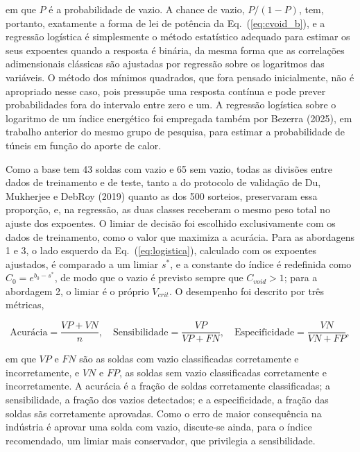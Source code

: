 \documentclass[12pt,openany]{report}
\begin{document}
\noindent em que $P$ é a probabilidade de vazio. A chance de vazio, $P/(1-P)$, tem, portanto, exatamente a forma de lei de potência da Eq.~(\ref{eq:cvoid_b}), e a regressão logística é simplesmente o método estatístico adequado para estimar os seus expoentes quando a resposta é binária, da mesma forma que as correlações adimensionais clássicas são ajustadas por regressão sobre os logaritmos das variáveis. O método dos mínimos quadrados, que fora pensado inicialmente, não é apropriado nesse caso, pois pressupõe uma resposta contínua e pode prever probabilidades fora do intervalo entre zero e um. A regressão logística sobre o logaritmo de um índice energético foi empregada também por Bezerra (2025), em trabalho anterior do mesmo grupo de pesquisa, para estimar a probabilidade de túneis em função do aporte de calor.

Como a base tem 43 soldas com vazio e 65 sem vazio, todas as divisões entre dados de treinamento e de teste, tanto a do protocolo de validação de Du, Mukherjee e DebRoy (2019) quanto as dos 500 sorteios, preservaram essa proporção, e, na regressão, as duas classes receberam o mesmo peso total no ajuste dos expoentes. O limiar de decisão foi escolhido exclusivamente com os dados de treinamento, como o valor que maximiza a acurácia. Para as abordagens 1 e 3, o lado esquerdo da Eq.~(\ref{eq:logistica}), calculado com os expoentes ajustados, é comparado a um limiar $s^{*}$, e a constante do índice é redefinida como $C_0 = e^{b_0 - s^{*}}$, de modo que o vazio é previsto sempre que $C_{void} > 1$; para a abordagem 2, o limiar é o próprio $V_{crit}$. O desempenho foi descrito por três métricas,

\begin{equation}
\text{Acurácia} = \frac{VP + VN}{n}, \quad \text{Sensibilidade} = \frac{VP}{VP + FN}, \quad \text{Especificidade} = \frac{VN}{VN + FP},
\label{eq:metricas}
\end{equation}

\noindent em que $VP$ e $FN$ são as soldas com vazio classificadas corretamente e incorretamente, e $VN$ e $FP$, as soldas sem vazio classificadas corretamente e incorretamente. A acurácia é a fração de soldas corretamente classificadas; a sensibilidade, a fração dos vazios detectados; e a especificidade, a fração das soldas sãs corretamente aprovadas. Como o erro de maior consequência na indústria é aprovar uma solda com vazio, discute-se ainda, para o índice recomendado, um limiar mais conservador, que privilegia a sensibilidade.

\end{document}
